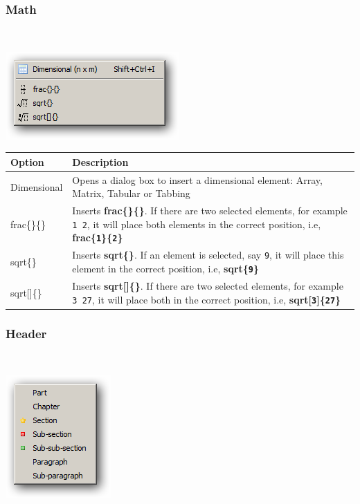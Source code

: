 \hypertarget{menu_insert_latex_math}{}
\subsubsection{Math}\\

\includegraphics[scale=0.50]{./res/menu_insert_latex_math.png}\\

\begin{scriptsize}\begin{tabularx}{\textwidth}{>{\hsize=0.2\hsize}X>{\hsize=0.8\hsize}X}\\
    \hline \textbf{Option} & \textbf{Description} \\
    \hline
    Dimensional & Opens a dialog box to insert a dimensional element: Array, Matrix, Tabular or Tabbing \\
    \hline
    frac\{\}\{\} & Inserts \textbf{frac\{\}\{\}}. If there are two selected elements, for example \texttt{1 2}, it will place both elements in the correct position, i.e, \textbf{frac\{\texttt{1}\}\{\texttt{2}\}} \\
    sqrt\{\} & Inserts \textbf{sqrt\{\}}. If an element is selected, say \texttt{9}, it will place this element in the correct position, i.e, \textbf{sqrt\{\texttt{9}\}} \\
    sqrt[]\{\} & Inserts \textbf{sqrt[]\{\}}. If there are two selected elements, for example \texttt{3 27}, it will place both in the correct position, i.e, \textbf{sqrt[\texttt{3}]\{\texttt{27}\}} \\
    \hline
  \end{tabularx}\end{scriptsize}


\newpage
\hypertarget{menu_insert_latex_header}{}
\subsubsection{Header}\\

\includegraphics[scale=0.50]{./res/menu_insert_latex_header.png}\\

